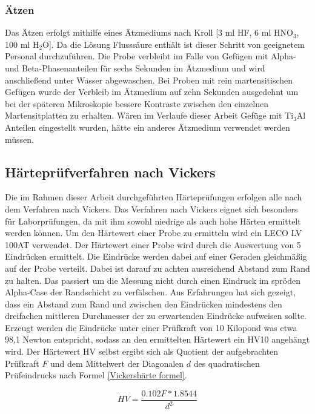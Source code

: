 \documentclass[a4paper, 11pt]{tubsreprt}
\begin{document}
\subsubsection{Ätzen}
Das Ätzen erfolgt mithilfe eines Ätzmediums nach Kroll [3 ml HF, 6 ml HNO$_{3}$, 100 ml H$_{2}$O]. Da die Lösung Flusssäure enthält ist dieser Schritt von geeignetem Personal durchzuführen. Die Probe verbleibt im Falle von Gefügen mit Alpha- und Beta-Phasenanteilen für sechs Sekunden im Ätzmedium und wird anschließend unter Wasser abgewaschen. Bei Proben mit rein martensitischen Gefügen wurde der Verbleib im Ätzmedium auf zehn Sekunden ausgedehnt um bei der späteren Mikroskopie bessere Kontraste zwischen den einzelnen Martensitplatten zu erhalten. Wären im Verlaufe dieser Arbeit Gefüge mit Ti$_{3}$Al Anteilen eingestellt wurden, hätte ein anderes Ätzmedium verwendet werden müssen.

\subsection{Härteprüfverfahren nach Vickers}
Die im Rahmen dieser Arbeit durchgeführten Härteprüfungen erfolgen alle nach dem Verfahren nach Vickers. Das Verfahren nach Vickers eignet sich besonders für Laborprüfungen, da mit ihm sowohl niedrige als auch hohe Härten ermittelt werden können. Um den Härtewert einer Probe zu ermitteln wird ein LECO LV 100AT verwendet. Der Härtewert einer Probe wird durch die Auswertung von 5 Eindrücken ermittelt. Die Eindrücke werden dabei auf einer Geraden gleichmäßig auf der Probe verteilt. Dabei ist darauf zu achten ausreichend Abstand zum Rand  zu halten. Das passiert um die Messung nicht durch einen Eindruck im spröden Alpha-Case der Randschicht zu verfälschen. Aus Erfahrungen hat sich gezeigt, dass ein Abstand zum Rand und zwischen den Eindrücken mindestens den dreifachen mittleren Durchmesser der zu erwartenden Eindrücke aufweisen sollte.
Erzeugt werden die Eindrücke unter einer Prüfkraft von 10 Kilopond was etwa 98,1 Newton entspricht, sodass an den ermittelten Härtewert ein HV10 angehängt wird. Der Härtewert HV selbst ergibt sich als Quotient der aufgebrachten Prüfkraft $F$ und dem Mittelwert der Diagonalen $d$ des quadratischen Prüfeindrucks  nach Formel \ref{Vickershärte formel}.

\begin{equation}
HV = \frac{ 0.102 F * 1.8544 }{ d^{ 2 } }
\label{Vickershärte formel}
\end{equation}
\end{document}
